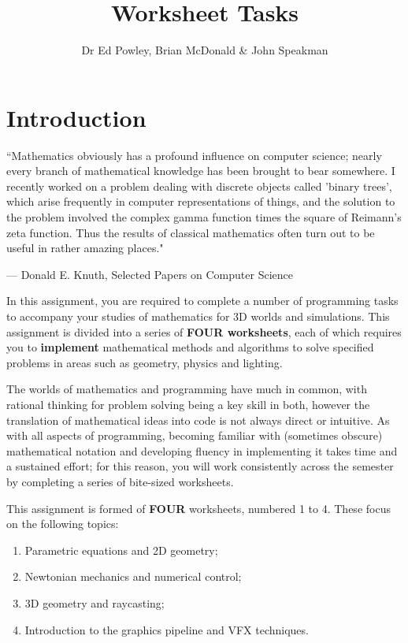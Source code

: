 \documentclass{../../fal_assignment}
\title{Worksheet Tasks}
\author{Dr Ed Powley, Brian McDonald \& John Speakman}
\begin{document}
\maketitle

\section*{Introduction}

\begin{marginquote}
``Mathematics obviously has a profound influence on computer science; nearly every branch of mathematical knowledge has been brought to bear somewhere. I recently worked on a problem dealing with discrete objects called 'binary trees', which arise frequently in computer representations of things, and the solution to the problem involved the complex gamma function times the square of  Reimann's zeta function. Thus the results of classical mathematics often turn out to be useful in rather amazing places."

\par --- Donald E. Knuth, Selected Papers on Computer Science
\end{marginquote}

In this assignment, you are required to complete a number of programming tasks to accompany your studies of mathematics for 3D worlds and simulations. This assignment is divided into a series of \textbf{FOUR worksheets}, each of which requires you to \textbf{implement} mathematical methods and algorithms to solve specified problems in areas such as geometry, physics and lighting.

The worlds of mathematics and programming have much in common, with rational thinking for problem solving being a key skill in both, however the translation of mathematical ideas into code is not always direct or intuitive. As with all aspects of programming, becoming familiar with (sometimes obscure) mathematical notation and developing fluency in implementing it takes time and a sustained effort; for this reason, you will work consistently across the semester by completing a series of bite-sized worksheets.

This assignment is formed of \textbf{FOUR} worksheets, numbered 1 to 4.
These focus on the following topics:
\begin{enumerate}[label=\arabic*)]
	\item Parametric equations and 2D geometry;
	\item Newtonian mechanics and numerical control;
	\item 3D geometry and raycasting;
	\item Introduction to the graphics pipeline and VFX techniques.
\end{enumerate}
\end{document}
